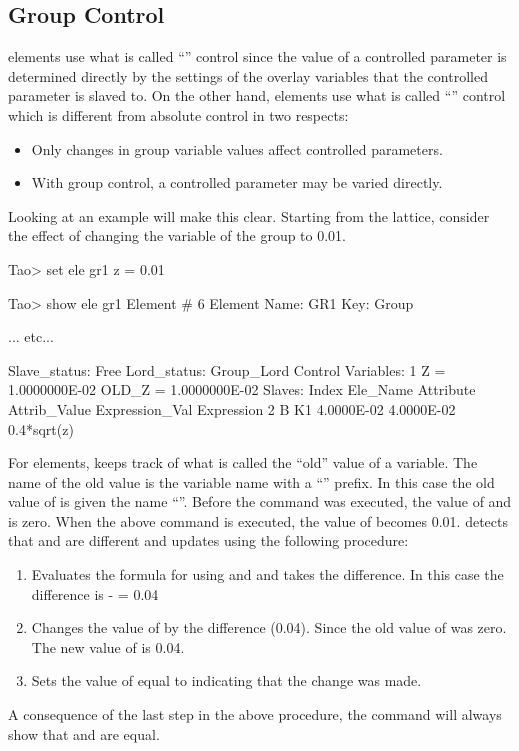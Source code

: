 \documentclass{hitec}     %
\begin{document}
{{{{%
\subsection{Group Control}

 elements use what is called ``'' control since the value of a controlled
parameter is determined directly by the settings of the overlay variables that the controlled
parameter is slaved to.  On the other hand,  elements use what is called ``''
control which is different from absolute control in two respects:
\begin{itemize}
\item
Only changes in group variable values affect controlled parameters.
\item
With group control, a controlled parameter may be varied directly.
\end{itemize}

Looking at an example will make this clear. Starting from the  lattice, consider the effect
of changing the  variable of the group  to 0.01.
\begin{code} 
Tao> set ele gr1 z = 0.01

Tao> show ele gr1
 Element #                6
 Element Name: GR1
 Key: Group

... etc...    

Slave_status: Free
Lord_status:  Group_Lord
Control Variables:
    1   Z  =  1.0000000E-02           OLD_Z  =  1.0000000E-02
Slaves:
   Index   Ele_Name  Attribute   Attrib_Value  Expression_Val    Expression
       2   B         K1            4.0000E-02      4.0000E-02    0.4*sqrt(z)
\end{code}
For  elements, \bmad keeps track of what is called the ``old'' value of a variable. The
name of the old value is the variable name with a ``'' prefix. In this case the old value
of  is given the name ``''. Before the  command was executed, the
value of  and  is zero. When the above  command is executed, the
value of  becomes 0.01. \bmad detects that  and  are different and updates
 using the following procedure: \vspace{-5 pt}
\begin{enumerate}
\item
Evaluates the formula for  using  and  and takes the difference.
In this case the difference is  -  = 0.04
\item
Changes the value of  by the difference (0.04).
Since the old value of  was zero. The new value of  is 0.04.
\item
Sets the value of  equal to  indicating that the change was made.
\end{enumerate}
A consequence of the last step in the above procedure, the  command will
always show that  and  are equal.

}}}}
\end{document}
